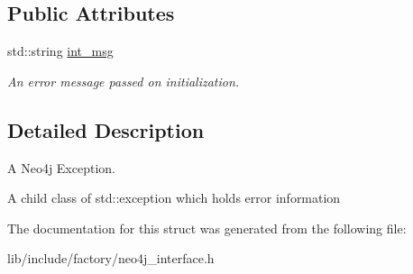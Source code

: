 \subsection*{Public Attributes}
\begin{DoxyCompactItemize}
\item 
\hypertarget{structNeo4jException_a49252646cf779b582d6224c46586416b}{std\-::string \hyperlink{structNeo4jException_a49252646cf779b582d6224c46586416b}{int\-\_\-msg}}\label{structNeo4jException_a49252646cf779b582d6224c46586416b}

\begin{DoxyCompactList}\small\item\em An error message passed on initialization. \end{DoxyCompactList}\end{DoxyCompactItemize}


\subsection{Detailed Description}
A Neo4j Exception. 

A child class of std\-::exception which holds error information 

The documentation for this struct was generated from the following file\-:\begin{DoxyCompactItemize}
\item 
lib/include/factory/neo4j\-\_\-interface.\-h\end{DoxyCompactItemize}

